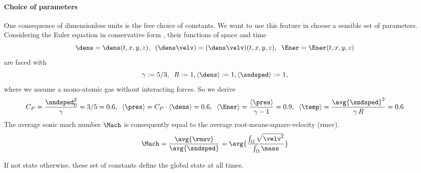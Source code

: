 \paragraph{Choice of parameters} One consequence of dimensionless units is the free
choice of constants. We want to use this feature in choose a sensible set of parameters.
Considering the Euler equation in conservative form , their functions
of space and time
\begin{equation}
\dens = \dens(t,x,y,z), \;\;(\dens\velv) = (\dens\velv)(t,x,y,z),\;\;\Ener = \Ener(t,x,y,z)
\end{equation}
are faced with
\begin{equation}
\gamma := 5/3,\;\;R := 1, \langle\dens\rangle := 1,\langle\sndsped\rangle := 1,
\end{equation}
where we assume a mono-atomic gas without interacting forces. So we derive
\begin{equation}
C_P = \frac{\sndsped_0^2}{\gamma} = 3/5 = 0.6,\;\;
\langle\pres\rangle = C_P\cdot\langle\dens\rangle = 0.6,\;\;
\langle\Ener\rangle = \frac{\langle\pres\rangle}{\gamma -1} = 0.9,\;\;
\langle\temp\rangle = \frac{\avg{\sndsped}^2}{\gamma\,R} = 0.6
\end{equation}
\remark The average sonic mach number $\Mach$ is consequently equal to the
average root-means-square-velocity (rmsv).
\begin{equation}
\Mach = \frac{\avg{\rmsv}}{\avg{\sndsped}} = \avg{\frac{\int_\Omega \sqrt{\velv^2}}{\int_\Omega \mass}}
\end{equation}

If not state otherwise, these set of constants define the global state at all times.

